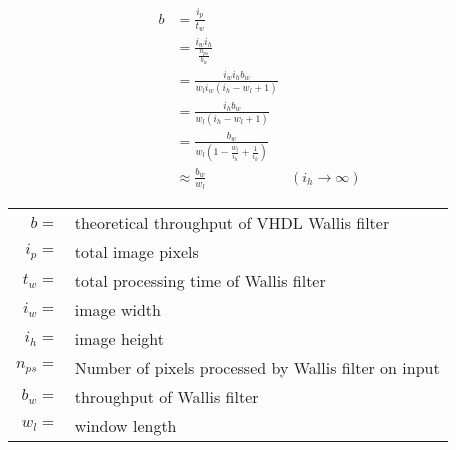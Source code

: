\begin{align}
    b  & = \frac{i_p}{t_w} &\\
       & = \frac{i_wi_h}{\frac{n_{ps}}{b_w}} &\\
       & = \frac{i_w i_h b_w}{w_l i_w (i_h-w_l+1)} &\\
       & = \frac{i_hb_w}{w_l (i_h-w_l+1)} &\\
       & = \frac{b_w}{w_l (1-\frac{w_l}{i_h}+\frac{1}{i_h})} &\\
       & \approx \frac{b_w}{w_l} &(i_h \to \infty)
    \label{eq:theomaxvhdlwallis}
\end{align}
\begin{tabular}{rl}
    $b     =$ & theoretical throughput of VHDL Wallis filter \\
    $i_p   =$ & total image pixels \\
    $t_w   =$ & total processing time of Wallis filter \\
    $i_w   =$ & image width \\
    $i_h   =$ & image height \\
    $n_{ps}=$ & Number of pixels processed by Wallis filter on input \\
    $b_w   =$ & throughput of Wallis filter \\
    $w_l   =$ & window length \\
\end{tabular} \\
